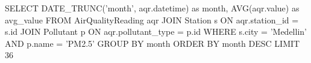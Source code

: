 SELECT 
    DATE_TRUNC('month', aqr.datetime) as month,
    AVG(aqr.value) as avg_value
FROM AirQualityReading aqr
JOIN Station s ON aqr.station_id = s.id
JOIN Pollutant p ON aqr.pollutant_type = p.id
WHERE s.city = 'Medellin'
AND p.name = 'PM2.5'
GROUP BY month
ORDER BY month DESC
LIMIT 36